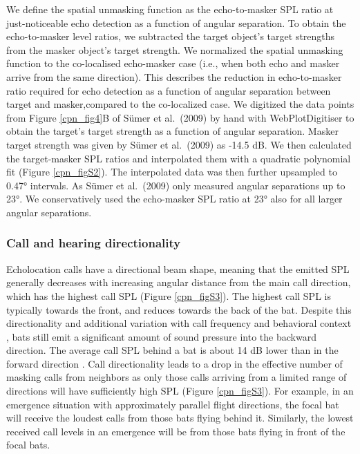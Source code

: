 \documentclass[
]{book}
\begin{document}
We define the spatial unmasking function as the echo-to-masker SPL ratio at just-noticeable echo detection as a function of angular separation. To obtain the echo-to-masker level ratios, we subtracted the target object's target strengths from the masker object's target strength. We normalized the spatial unmasking function to the co-localised echo-masker case (i.e., when both echo and masker arrive from the same direction). This describes the reduction in echo-to-masker ratio required for echo detection as a function of angular separation between target and masker,compared to the co-localized case. We digitized the data points from Figure \ref{cpn_fig4}B of Sümer et al.~(2009) by hand with WebPlotDigitiser \citep{rohatgi2015a} to obtain the target's target strength as a function of angular separation. Masker target strength was given by Sümer et al.~(2009) as -14.5 dB. We then calculated the target-masker SPL ratios and interpolated them with a quadratic polynomial fit (Figure \ref{cpn_figS2}). The interpolated data was then further upsampled to 0.47° intervals. As Sümer et al.~(2009) only measured angular separations up to 23°. We conservatively used the echo-masker SPL ratio at 23° also for all larger angular separations.

\hypertarget{call-and-hearing-directionality}{%
\subsubsection{\texorpdfstring{Call and hearing directionality \label{cpn_directionality}}{Call and hearing directionality }}\label{call-and-hearing-directionality}}

Echolocation calls have a directional beam shape, meaning that the emitted SPL
generally decreases with increasing angular distance from the main call direction, which has the highest call SPL (Figure \ref{cpn_figS3}). The highest call SPL is typically towards the front, and reduces towards the back of the bat. Despite this directionality and additional variation with call frequency and behavioral context \citep[\citet{l2013a},\citet{surlykke2012a},\citet{giuggioli2015a}]{jakobsen2010a} , bats still emit a significant amount of sound pressure into the backward direction. The average call SPL behind a bat is about 14 dB lower than in the forward direction \citep[\citet{stidsholt2018a}]{giuggioli2015a}. Call directionality leads to a drop in the effective number of masking calls from neighbors as only those calls arriving from a limited range of directions will have sufficiently high SPL (Figure \ref{cpn_figS3}). For example, in an emergence situation with approximately parallel flight directions, the focal bat will receive the loudest calls from those bats flying behind it. Similarly, the lowest received call levels in an emergence will be from those bats flying in front of the focal bats.
\end{document}
